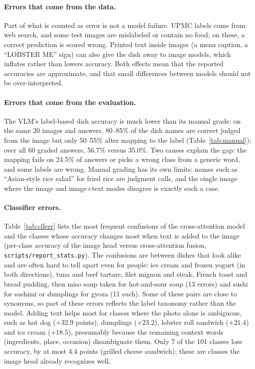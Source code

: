 \documentclass[11pt,a4paper]{article}
\begin{document}
\paragraph{Errors that come from the data.}
Part of what is counted as error is not a model failure. UPMC labels come from web search, and some test images are
mislabeled or contain no food; on these, a correct prediction is scored wrong. Printed text inside images (a menu
caption, a ``LOBSTER ME'' sign) can also give the dish away to image models, which inflates rather than lowers
accuracy. Both effects mean that the reported accuracies are approximate, and that small differences between
models should not be over-interpreted.

\paragraph{Errors that come from the evaluation.}
The VLM's label-based dish accuracy is much lower than its manual grade: on the same 20 images and answers, 80--85\%
of the dish names are correct judged from the image but only 50--55\% after mapping to the label
(Table~\ref{tab:manual}); over all 60 graded answers, 56.7\% versus 35.0\%. Two causes explain the gap: the mapping
fails on 24.5\% of answers or picks a wrong class from a generic word, and some labels are wrong. Manual grading
has its own limits: names such as ``Asian-style rice salad'' for fried rice are judgment calls, and the single
image where the image and image+text modes disagree is exactly such a case.

\paragraph{Classifier errors.}
Table~\ref{tab:clferr} lists the most frequent confusions of the cross-attention model and the classes whose
accuracy changes most when text is added to the image (per-class accuracy of the image head versus cross-attention
fusion, \texttt{scripts/report\_stats.py}). The confusions are between dishes that look alike and are often hard
to tell apart even for people: ice cream and frozen yogurt (in both directions), tuna and beef tartare, filet mignon
and steak, French toast and bread pudding, then miso soup taken for hot-and-sour soup (13 errors) and sushi for
sashimi or dumplings for gyoza (11 each).
Some of these pairs are close to synonyms, so part of these errors reflects the label taxonomy rather than the
model. Adding text helps most for classes where the photo alone is ambiguous, such as hot dog ($+32.9$ points),
dumplings ($+23.2$), lobster roll sandwich ($+21.4$) and ice cream ($+18.5$), presumably because the remaining
context words (ingredients, place, occasion) disambiguate them. Only 7 of the 101 classes lose accuracy, by at
most 4.4 points (grilled cheese sandwich); these are classes the image head already recognizes well.
\end{document}
